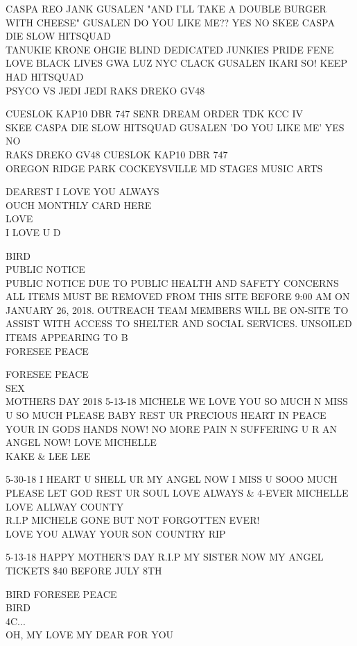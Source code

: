 \documentclass[10pt,letterpaper]{article}
\begin{document}
CASPA REO JANK GUSALEN "AND I'LL TAKE A DOUBLE BURGER WITH CHEESE" GUSALEN DO YOU LIKE ME?? YES NO SKEE CASPA DIE SLOW HITSQUAD\\
TANUKIE KRONE OHGIE BLIND DEDICATED JUNKIES PRIDE FENE\\
LOVE BLACK LIVES GWA LUZ NYC CLACK GUSALEN IKARI SO!  KEEP HAD HITSQUAD\\
PSYCO VS JEDI JEDI RAKS DREKO GV48

CUESLOK KAP10 DBR 747 SENR DREAM ORDER TDK KCC IV\\
SKEE CASPA DIE SLOW HITSQUAD GUSALEN 'DO YOU LIKE ME' YES NO\\
RAKS DREKO GV48 CUESLOK KAP10 DBR 747\\
OREGON RIDGE PARK COCKEYSVILLE MD STAGES MUSIC ARTS

DEAREST I LOVE YOU ALWAYS\\
OUCH MONTHLY CARD HERE\\
LOVE\\
I LOVE U D

BIRD\\
PUBLIC NOTICE\\
PUBLIC NOTICE DUE TO PUBLIC HEALTH AND SAFETY CONCERNS ALL ITEMS MUST BE REMOVED FROM THIS SITE BEFORE 9:00 AM ON JANUARY 26, 2018.  OUTREACH TEAM MEMBERS WILL BE ON{-}SITE TO ASSIST WITH ACCESS TO SHELTER AND SOCIAL SERVICES.  UNSOILED ITEMS APPEARING TO B\\
FORESEE PEACE

FORESEE PEACE\\
SEX\\
MOTHERS DAY 2018 5{-}13{-}18 MICHELE WE LOVE YOU SO MUCH N MISS U SO MUCH PLEASE BABY REST UR PRECIOUS HEART IN PEACE YOUR IN GODS HANDS NOW!  NO MORE PAIN N SUFFERING U R AN ANGEL NOW!  LOVE MICHELLE\\
KAKE \& LEE LEE

5{-}30{-}18 I HEART U SHELL UR MY ANGEL NOW I MISS U SOOO MUCH PLEASE LET GOD REST UR SOUL LOVE ALWAYS \& 4{-}EVER MICHELLE\\
LOVE ALLWAY COUNTY\\
R.I.P MICHELE GONE BUT NOT FORGOTTEN EVER!\\
LOVE YOU ALWAY YOUR SON COUNTRY RIP

5{-}13{-}18 HAPPY MOTHER'S DAY R.I.P MY SISTER NOW MY ANGEL\\
TICKETS \$40 BEFORE JULY 8TH

BIRD FORESEE PEACE\\
BIRD\\
4C...\\
OH, MY LOVE MY DEAR FOR YOU
\end{document}
